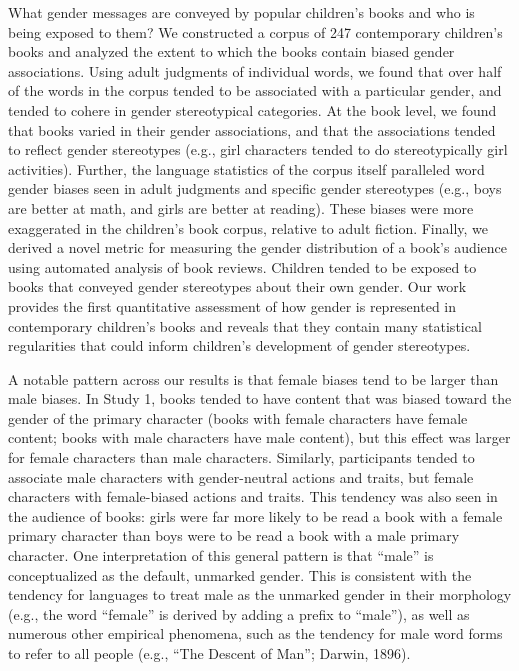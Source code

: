 \documentclass[
  english,
  ,man,floatsintext]{apa6}
\begin{document}
What gender messages are conveyed by popular children's books and who is being exposed to them? We constructed a corpus of 247 contemporary children's books and analyzed the extent to which the books contain biased gender associations. Using adult judgments of individual words, we found that over half of the words in the corpus tended to be associated with a particular gender, and tended to cohere in gender stereotypical categories. At the book level, we found that books varied in their gender associations, and that the associations tended to reflect gender stereotypes (e.g., girl characters tended to do stereotypically girl activities). Further, the language statistics of the corpus itself paralleled word gender biases seen in adult judgments and specific gender stereotypes (e.g., boys are better at math, and girls are better at reading). These biases were more exaggerated in the children's book corpus, relative to adult fiction. Finally, we derived a novel metric for measuring the gender distribution of a book's audience using automated analysis of book reviews. Children tended to be exposed to books that conveyed gender stereotypes about their own gender. Our work provides the first quantitative assessment of how gender is represented in contemporary children's books and reveals that they contain many statistical regularities that could inform children's development of gender stereotypes.

A notable pattern across our results is that female biases tend to be larger than male biases. In Study 1, books tended to have content that was biased toward the gender of the primary character (books with female characters have female content; books with male characters have male content), but this effect was larger for female characters than male characters. Similarly, participants tended to associate male characters with gender-neutral actions and traits, but female characters with female-biased actions and traits. This tendency was also seen in the audience of books: girls were far more likely to be read a book with a female primary character than boys were to be read a book with a male primary character. One interpretation of this general pattern is that ``male'' is conceptualized as the default, unmarked gender. This is consistent with the tendency for languages to treat male as the unmarked gender in their morphology (e.g., the word ``female'' is derived by adding a prefix to ``male''), as well as numerous other empirical phenomena, such as the tendency for male word forms to refer to all people (e.g., {``The Descent of Man''}; Darwin, 1896).
\end{document}
